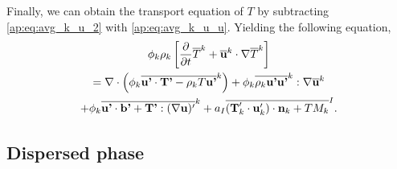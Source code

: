 Finally, we can obtain the transport equation of $T$ by subtracting \ref{ap:eq:avg_k_u_2} with \ref{ap:eq:avg_k_u_u}. 
Yielding the following equation, 
\begin{multline}
    \phi_k\rho_k  \left[
        \frac{\partial }{\partial t}
        \overline{T}^k
        +\overline{\textbf{u}}^k\cdot\mathbf{\nabla} 
        \overline{T}^k
    \right]\\
    =
    \mathbf{\nabla}\cdot\left(
        \phi_k
        \overline{\textbf{u'}\cdot \textbf{T'}
        - \rho_k T\textbf{u'}}^k
    \right)
    +\phi_k\overline{\rho_k \textbf{u'u'}}^k:\mathbf{\nabla}
         \overline{\textbf{u}}^k\\
    +\phi_k\overline{\textbf{u'}\cdot\textbf{b'} + \textbf{T'}: (\mathbf{\nabla}\textbf{u})'}^k
    +a_I \overline{
        (\textbf{T}_k'\cdot\textbf{u}'_k)\cdot\textbf{n}_k
        + T M_k}^I.
    \label{ap:eq:avg_k_T}
\end{multline}


\subsection*{Dispersed phase}

